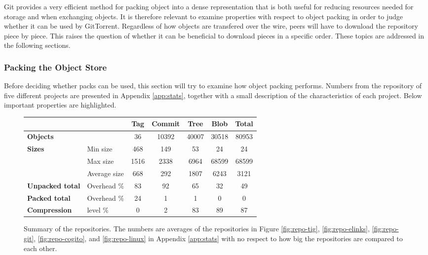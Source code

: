 Git provides a very efficient method for packing object into a dense
representation that is both useful for reducing resources needed for
storage and when exchanging objects. It is therefore relevant to
examine properties with respect to object packing in order
to judge whether it can be used by GitTorrent. Regardless of how
objects are transfered over the wire, peers will have to download the
repository piece by piece. This raises the question of whether it can
be beneficial to download pieces in a specific order.
These topics are addressed in the following sections.


\subsubsection{Packing the Object Store}

Before deciding whether packs can be used, this section will try to
examine how object packing performs. Numbers from the repository of
five different projects are presented in Appendix \ref{app:stats},
together with a small description of the characteristics of each
project. Below important properties are highlighted.

\begin{figure}%
\begin{center}
\begin{tabular}[h]{|l|l||c|c|c|c||c|}
		\hline
		& & \textbf{Tag} & \textbf{Commit} & \textbf{Tree} & \textbf{Blob} & \textbf{Total} \\
		\hline
\textbf{Objects} &   & 36 & 10392 & 40007 & 30518 & 80953 \\
\hline
\textbf{Sizes} & Min size  & 468 & 149 & 53 & 24 & 24 \\
 & Max size  & 1516 & 2338 & 6964 & 68599 & 68599 \\
 & Average size  & 668 & 292 & 1807 & 6243 & 3121 \\
\hline
\textbf{Unpacked total} & Overhead \%   & 83 & 92 & 65 & 32 & 49 \\
\hline
\textbf{Packed total} & Overhead \%  & 24 & 1 & 1 & 0 & 0 \\
\hline
\textbf{Compression} &  level \% & 0 & 2 & 83 & 89 & 87 \\
\hline
		\end{tabular}

\caption{Summary of the repositories. The numbers are averages of the
repositories in Figure \ref{fig:repo-tig}, \ref{fig:repo-elinks},
\ref{fig:repo-git}, \ref{fig:repo-cogito}, and \ref{fig:repo-linux} in Appendix \ref{app:stats}
with no respect to how big the repositories are compared to each other.}

	\label{fig:stats-summary}

\end{center}
\end{figure}

